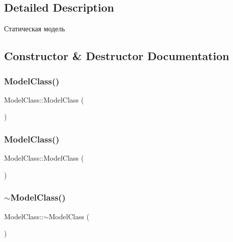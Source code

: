\subsection{Detailed Description}
Статическая модель 

\subsection{Constructor \& Destructor Documentation}
\mbox{\label{class_model_class_aeb071c40b6fc3b5fb187f25708a1fd3e}} 
\subsubsection{\texorpdfstring{Model\+Class()}{ModelClass()}\hspace{0.1cm}{\footnotesize\ttfamily [1/2]}}
{\footnotesize\ttfamily Model\+Class\+::\+Model\+Class (\begin{DoxyParamCaption}{ }\end{DoxyParamCaption})}

\mbox{\label{class_model_class_aeb339837cd8817e230079a1c8eb333a5}} 
\subsubsection{\texorpdfstring{Model\+Class()}{ModelClass()}\hspace{0.1cm}{\footnotesize\ttfamily [2/2]}}
{\footnotesize\ttfamily Model\+Class\+::\+Model\+Class (\begin{DoxyParamCaption}\item[{const \hyperlink{class_model_class}{Model\+Class} \&}]{ }\end{DoxyParamCaption})}

\mbox{\label{class_model_class_a8e1437289527dedb467aaa04cdbf90b9}} 
\subsubsection{\texorpdfstring{$\sim$\+Model\+Class()}{~ModelClass()}}
{\footnotesize\ttfamily Model\+Class\+::$\sim$\+Model\+Class (\begin{DoxyParamCaption}{ }\end{DoxyParamCaption})}



